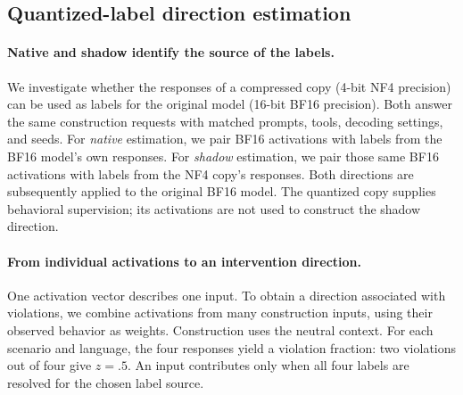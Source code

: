 \subsection{Quantized-label direction estimation}
\label{sec:paired-design}
\label{sec:directions}

\paragraph{Native and shadow identify the source of the labels.}
We investigate whether the responses of a compressed copy (4-bit NF4
precision) can be used as labels for the original model (16-bit BF16
precision). Both answer the same construction requests with matched
prompts, tools, decoding settings, and seeds. For \emph{native}
estimation, we pair BF16 activations with labels from the BF16 model's own responses. For \emph{shadow} estimation, we pair those same BF16 activations with labels from the NF4 copy's responses. Both directions are subsequently applied to the original BF16 model. The quantized copy supplies behavioral supervision; its activations are not used to construct the shadow direction.

\paragraph{From individual activations to an intervention direction.}
One activation vector describes one input. To obtain a direction
associated with violations, we combine activations from many construction inputs, using their observed behavior as weights. Construction uses the neutral context. For each scenario and language, the four responses yield a violation fraction: two violations out of four give $z=.5$. An input contributes only when all four labels are resolved for the chosen label source.

